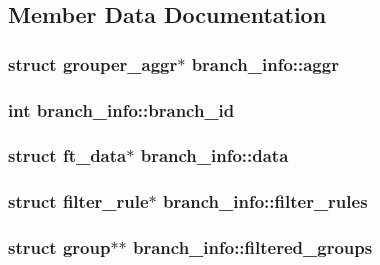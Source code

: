 \subsection{\-Member \-Data \-Documentation}
\hypertarget{structbranch__info_a1248264340222f00113692e6692d1ee7}{
\subsubsection[{aggr}]{\setlength{\rightskip}{0pt plus 5cm}struct {\bf grouper\-\_\-aggr}$\ast$ {\bf branch\-\_\-info\-::aggr}}}\label{structbranch__info_a1248264340222f00113692e6692d1ee7}
\hypertarget{structbranch__info_a6cbcf2bcb1c568d814ed65d44d3863f3}{
\subsubsection[{branch\-\_\-id}]{\setlength{\rightskip}{0pt plus 5cm}int {\bf branch\-\_\-info\-::branch\-\_\-id}}}\label{structbranch__info_a6cbcf2bcb1c568d814ed65d44d3863f3}
\hypertarget{structbranch__info_a349eec62cfbb3890aa0610e0d983f3b1}{
\subsubsection[{data}]{\setlength{\rightskip}{0pt plus 5cm}struct {\bf ft\-\_\-data}$\ast$ {\bf branch\-\_\-info\-::data}}}\label{structbranch__info_a349eec62cfbb3890aa0610e0d983f3b1}
\hypertarget{structbranch__info_a7e37880a544c6af0c068187b80ec3215}{
\subsubsection[{filter\-\_\-rules}]{\setlength{\rightskip}{0pt plus 5cm}struct {\bf filter\-\_\-rule}$\ast$ {\bf branch\-\_\-info\-::filter\-\_\-rules}}}\label{structbranch__info_a7e37880a544c6af0c068187b80ec3215}
\hypertarget{structbranch__info_a4645514f5b85b8acdedebc78998a11d4}{
\subsubsection[{filtered\-\_\-groups}]{\setlength{\rightskip}{0pt plus 5cm}struct {\bf group}$\ast$$\ast$ {\bf branch\-\_\-info\-::filtered\-\_\-groups}}}\label{structbranch__info_a4645514f5b85b8acdedebc78998a11d4}

